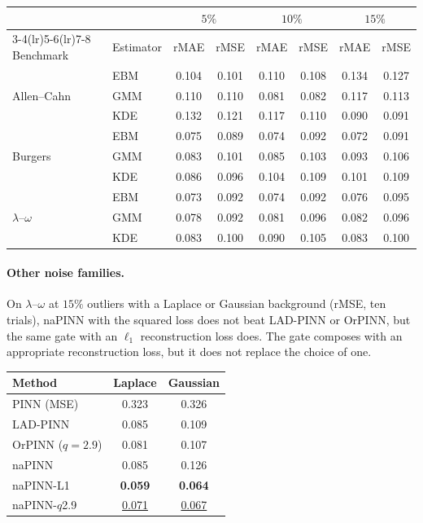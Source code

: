 \documentclass[twoside]{article}
\begin{document}
\begin{center}\small
\setlength{\tabcolsep}{4pt}
\begin{tabular}{llcccccc}
\toprule
& & \multicolumn{2}{c}{$5\%$} & \multicolumn{2}{c}{$10\%$} & \multicolumn{2}{c}{$15\%$} \\
\cmidrule(lr){3-4}\cmidrule(lr){5-6}\cmidrule(lr){7-8}
Benchmark & Estimator & rMAE & rMSE & rMAE & rMSE & rMAE & rMSE \\
\midrule
\multirow{3}{*}{Allen--Cahn}
 & EBM & 0.104 & 0.101 & 0.110 & 0.108 & 0.134 & 0.127 \\
 & GMM & 0.110 & 0.110 & 0.081 & 0.082 & 0.117 & 0.113 \\
 & KDE & 0.132 & 0.121 & 0.117 & 0.110 & 0.090 & 0.091 \\
\midrule
\multirow{3}{*}{Burgers}
 & EBM & 0.075 & 0.089 & 0.074 & 0.092 & 0.072 & 0.091 \\
 & GMM & 0.083 & 0.101 & 0.085 & 0.103 & 0.093 & 0.106 \\
 & KDE & 0.086 & 0.096 & 0.104 & 0.109 & 0.101 & 0.109 \\
\midrule
\multirow{3}{*}{$\lambda$--$\omega$}
 & EBM & 0.073 & 0.092 & 0.074 & 0.092 & 0.076 & 0.095 \\
 & GMM & 0.078 & 0.092 & 0.081 & 0.096 & 0.082 & 0.096 \\
 & KDE & 0.083 & 0.100 & 0.090 & 0.105 & 0.083 & 0.100 \\
\bottomrule
\end{tabular}
\end{center}

\paragraph{Other noise families.}
On $\lambda$--$\omega$ at $15\%$ outliers with a Laplace or Gaussian background
(rMSE, ten trials), naPINN with the squared loss does not beat LAD-PINN or OrPINN, but the
same gate with an $\ell_1$ reconstruction loss does. The gate composes with an
appropriate reconstruction loss, but it does not replace the choice of one.

\begin{center}\small
\setlength{\tabcolsep}{8pt}
\begin{tabular}{lcc}
\toprule
Method & Laplace & Gaussian \\
\midrule
PINN (MSE) & 0.323 & 0.326 \\
LAD-PINN & 0.085 & 0.109 \\
OrPINN ($q = 2.9$) & 0.081 & 0.107 \\
naPINN & 0.085 & 0.126 \\
naPINN-L1 & \textbf{0.059} & \textbf{0.064} \\
naPINN-$q$2.9 & \underline{0.071} & \underline{0.067} \\
\bottomrule
\end{tabular}
\end{center}
\end{document}
